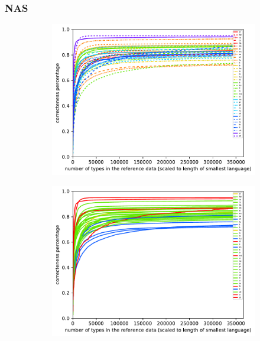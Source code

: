 \documentclass[11pt,a4paper,twoside,openright]{scrbook}
\begin{document}
\subsubsection{NAS}

\begin{figure}[h]
    \centering
    \begin{subfigure}[b]{0.32\textwidth}
    	\centering
        \includegraphics[width=\textwidth]{graphs/nas/norm_huge_type_token_performance}
    \end{subfigure}
    \begin{subfigure}[b]{0.32\textwidth}
    	\centering
        \includegraphics[width=\textwidth]{graphs/nas/morph_types/norm_huge_type_token_performance}
    \end{subfigure}

\end{figure}
\end{document}
